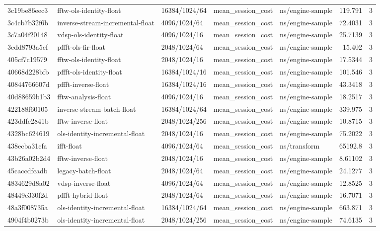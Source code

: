 \begin{longtable}{lllllrr}
3c19be86eec3 & fftw-ols-identity-float & 16384/1024/64 & mean\_session\_cost & ns/engine-sample & 119.791 & 3 \\
3c4cb7b32f6b & inverse-stream-incremental-float & 4096/1024/64 & mean\_session\_cost & ns/engine-sample & 72.4031 & 3 \\
3c7a04f20148 & vdsp-ols-identity-float & 4096/1024/16 & mean\_session\_cost & ns/engine-sample & 25.7139 & 3 \\
3edd8793a5cf & pffft-ols-fir-float & 2048/1024/64 & mean\_session\_cost & ns/engine-sample & 15.402 & 3 \\
405cf7c19579 & fftw-ols-identity-float & 2048/1024/16 & mean\_session\_cost & ns/engine-sample & 17.5344 & 3 \\
40668d228bfb & pffft-ols-identity-float & 16384/1024/16 & mean\_session\_cost & ns/engine-sample & 101.546 & 3 \\
40844766607d & pffft-inverse-float & 16384/1024/16 & mean\_session\_cost & ns/engine-sample & 43.3418 & 3 \\
40d88659b1b3 & fftw-analysis-float & 4096/1024/16 & mean\_session\_cost & ns/engine-sample & 18.2517 & 3 \\
422188f60105 & inverse-stream-batch-float & 16384/1024/64 & mean\_session\_cost & ns/engine-sample & 339.975 & 3 \\
423ddfe2841b & fftw-inverse-float & 2048/1024/256 & mean\_session\_cost & ns/engine-sample & 10.8715 & 3 \\
4328bc624619 & ols-identity-incremental-float & 2048/1024/16 & mean\_session\_cost & ns/engine-sample & 75.2022 & 3 \\
438ecba31cfa & ifft-float & 4096/1024/64 & mean\_session\_cost & ns/transform & 65192.8 & 3 \\
43b26a02b2d4 & fftw-inverse-float & 2048/1024/16 & mean\_session\_cost & ns/engine-sample & 8.61102 & 3 \\
45caccdfcadb & legacy-batch-float & 2048/1024/64 & mean\_session\_cost & ns/engine-sample & 24.1277 & 3 \\
4834629d8a02 & vdsp-inverse-float & 4096/1024/64 & mean\_session\_cost & ns/engine-sample & 12.8525 & 3 \\
48449c330f2d & pffft-hybrid-float & 2048/1024/64 & mean\_session\_cost & ns/engine-sample & 16.7071 & 3 \\
48a3f008735a & ols-identity-incremental-float & 16384/1024/64 & mean\_session\_cost & ns/engine-sample & 663.871 & 3 \\
4904f4b0273b & ols-identity-incremental-float & 2048/1024/256 & mean\_session\_cost & ns/engine-sample & 74.6135 & 3 \\

\end{longtable}
